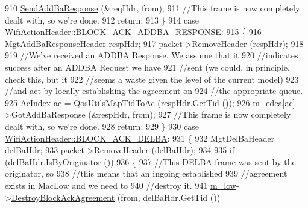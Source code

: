 \begin{DoxyCode}
910                 \hyperlink{classns3_1_1RegularWifiMac_a7f68e740fc48cfc03df7330077af8113}{SendAddBaResponse} (&reqHdr, from);
911                 \textcolor{comment}{//This frame is now completely dealt with, so we're done.}
912                 \textcolor{keywordflow}{return};
913               \}
914             \textcolor{keywordflow}{case} \hyperlink{classns3_1_1WifiActionHeader_a575d216d28074b8e5fc25d17692f6962ac3751303132994172def72465dba6db3}{WifiActionHeader::BLOCK\_ACK\_ADDBA\_RESPONSE}:
915               \{
916                 MgtAddBaResponseHeader respHdr;
917                 packet->\hyperlink{classns3_1_1Packet_a0961eccf975d75f902d40956c93ba63e}{RemoveHeader} (respHdr);
918 
919                 \textcolor{comment}{//We've received an ADDBA Response. We assume that it}
920                 \textcolor{comment}{//indicates success after an ADDBA Request we have}
921                 \textcolor{comment}{//sent (we could, in principle, check this, but it}
922                 \textcolor{comment}{//seems a waste given the level of the current model)}
923                 \textcolor{comment}{//and act by locally establishing the agreement on}
924                 \textcolor{comment}{//the appropriate queue.}
925                 \hyperlink{group__wifi_gab422b4562ba272b39a9b6bca3513f3ac}{AcIndex} ac = \hyperlink{group__wifi_ga4e36efcff6dd83eaee42e1af0de43d48}{QosUtilsMapTidToAc} (respHdr.GetTid ());
926                 \hyperlink{classns3_1_1RegularWifiMac_ac750365ab3708902cc0b7700164c706d}{m\_edca}[ac]->GotAddBaResponse (&respHdr, from);
927                 \textcolor{comment}{//This frame is now completely dealt with, so we're done.}
928                 \textcolor{keywordflow}{return};
929               \}
930             \textcolor{keywordflow}{case} \hyperlink{classns3_1_1WifiActionHeader_a575d216d28074b8e5fc25d17692f6962a31c45aded50eec5db8f12da960e3d239}{WifiActionHeader::BLOCK\_ACK\_DELBA}:
931               \{
932                 MgtDelBaHeader delBaHdr;
933                 packet->\hyperlink{classns3_1_1Packet_a0961eccf975d75f902d40956c93ba63e}{RemoveHeader} (delBaHdr);
934 
935                 \textcolor{keywordflow}{if} (delBaHdr.IsByOriginator ())
936                   \{
937                     \textcolor{comment}{//This DELBA frame was sent by the originator, so}
938                     \textcolor{comment}{//this means that an ingoing established}
939                     \textcolor{comment}{//agreement exists in MacLow and we need to}
940                     \textcolor{comment}{//destroy it.}
941                     \hyperlink{classns3_1_1RegularWifiMac_a726ce0ade9bb7e6b7d81cd397f32dbde}{m\_low}->\hyperlink{classns3_1_1MacLow_ada8f9b5da9cbfb2a63b1d740ab88216d}{DestroyBlockAckAgreement} (from, delBaHdr.GetTid ())

\end{DoxyCode}
